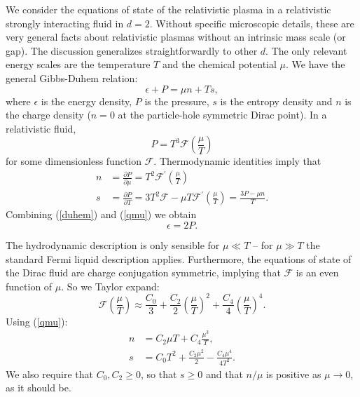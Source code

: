 \documentclass[10pt, oneside]{book}
\begin{document}
\begin{doublespace}
\begin{appendix}
We consider the equations of state of the relativistic plasma in a relativistic strongly interacting fluid in $d=2$.    Without specific microscopic details, these are very general facts about relativistic plasmas without an intrinsic mass scale (or gap).  The discussion generalizes straightforwardly to other $d$.    The only relevant energy scales are the temperature $T$ and the chemical potential $\mu$.     We have the general Gibbs-Duhem relation:\begin{equation} \label{duhem}
\epsilon + P = \mu n + Ts,
\end{equation}where $\epsilon$ is the energy density, $P$ is the pressure, $s$ is the entropy density and $n$ is the charge density ($n=0$ at the particle-hole symmetric Dirac point).   In a relativistic fluid, \begin{equation}
P  = T^3 \mathcal{F}\left(\frac{\mu}{T}\right)
\end{equation}for some dimensionless function $\mathcal{F}$.  Thermodynamic identities imply that \begin{subequations} \label{qmu}\begin{align}
n &= \frac{\partial P}{\partial \mu} = T^2 \mathcal{F}^\prime \left(\frac{\mu}{T}\right) \\
s &= \frac{\partial P}{\partial T} = 3T^2 \mathcal{F} -  \mu T\mathcal{F}^\prime \left(\frac{\mu}{T}\right) = \frac{3P - \mu n }{T}.
\end{align}\end{subequations}Combining (\ref{duhem}) and (\ref{qmu}) we obtain \begin{equation}
\epsilon = 2P.
\end{equation}

The hydrodynamic description is only sensible for $\mu \ll T$ -- for $\mu \gg T$ the standard Fermi liquid description applies.   Furthermore, the equations of state of the Dirac fluid are charge conjugation symmetric, implying that $\mathcal{F}$ is an even function of $\mu$.   So we Taylor expand: \begin{equation}
\mathcal{F}\left(\frac{\mu}{T}\right) \approx \frac{C_0}{3} + \frac{C_2}{2} \left(\frac{\mu}{T}\right)^2 +  \frac{C_4}{4} \left(\frac{\mu}{T}\right)^4.  \label{feq}
\end{equation} Using (\ref{qmu}): \begin{subequations}\begin{align}
n &= C_2 \mu T + C_4 \frac{\mu^3}{T}, \\
s &= C_0T^2 + \frac{C_2 \mu^2}{2} - \frac{C_4 \mu^4}{4T^2} .
\end{align}\end{subequations}
We also require that $C_0,C_2\ge 0$, so that $s\ge 0$ and that $n/\mu$ is positive as $\mu\rightarrow 0$, as it should be.


\end{appendix}
\end{doublespace}
\end{document}
